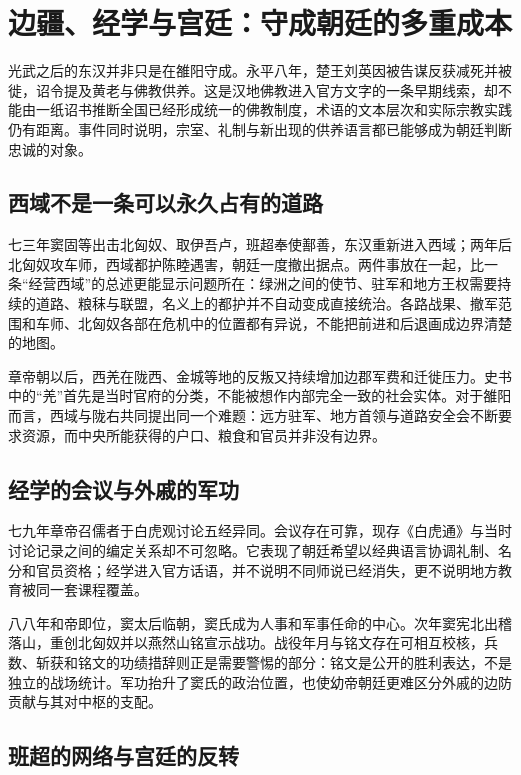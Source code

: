 \section{边疆、经学与宫廷：守成朝廷的多重成本}
\label{sec:eastern-han-frontier-learning-court}

光武之后的东汉并非只是在雒阳守成。永平八年，楚王刘英因被告谋反获减死并被徙，诏令提及黄老与佛教供养。这是汉地佛教进入官方文字的一条早期线索，却不能由一纸诏书推断全国已经形成统一的佛教制度，术语的文本层次和实际宗教实践仍有距离。事件同时说明，宗室、礼制与新出现的供养语言都已能够成为朝廷判断忠诚的对象。

\subsection{西域不是一条可以永久占有的道路}

七三年窦固等出击北匈奴、取伊吾卢，班超奉使鄯善，东汉重新进入西域；两年后北匈奴攻车师，西域都护陈睦遇害，朝廷一度撤出据点。两件事放在一起，比一条“经营西域”的总述更能显示问题所在：绿洲之间的使节、驻军和地方王权需要持续的道路、粮秣与联盟，名义上的都护并不自动变成直接统治。各路战果、撤军范围和车师、北匈奴各部在危机中的位置都有异说，不能把前进和后退画成边界清楚的地图。

章帝朝以后，西羌在陇西、金城等地的反叛又持续增加边郡军费和迁徙压力。史书中的“羌”首先是当时官府的分类，不能被想作内部完全一致的社会实体。对于雒阳而言，西域与陇右共同提出同一个难题：远方驻军、地方首领与道路安全会不断要求资源，而中央所能获得的户口、粮食和官员并非没有边界。

\subsection{经学的会议与外戚的军功}

七九年章帝召儒者于白虎观讨论五经异同。会议存在可靠，现存《白虎通》与当时讨论记录之间的编定关系却不可忽略。它表现了朝廷希望以经典语言协调礼制、名分和官员资格；经学进入官方话语，并不说明不同师说已经消失，更不说明地方教育被同一套课程覆盖。

八八年和帝即位，窦太后临朝，窦氏成为人事和军事任命的中心。次年窦宪北出稽落山，重创北匈奴并以燕然山铭宣示战功。战役年月与铭文存在可相互校核，兵数、斩获和铭文的功绩措辞则正是需要警惕的部分：铭文是公开的胜利表达，不是独立的战场统计。军功抬升了窦氏的政治位置，也使幼帝朝廷更难区分外戚的边防贡献与其对中枢的支配。

\subsection{班超的网络与宫廷的反转}

